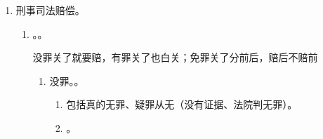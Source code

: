 \begin{enumerate}
\begin{kk}{为啥赔、谁来赔、赔给谁、怎么赔}
\begin{enumerate}
\begin{enumerate}
                    \item 复议加重侵害 \yjt 按份（各赔各）。原则共同被告，单独起诉一方，未被起诉的追加为第三人。
                    \item 派出所永远不赔。
                    \item 共同侵权共同赔。
                    \item 无意思联络的数人侵权。A || B/A + B \yjt 原因力竞合/结合 \yjt 连带/按份。
                    \item 第三人侵权。。
                  \end{enumerate}
            \item 赔给谁。\yi 同原告。\er 支付了合理费用的人可以要求赔偿。。
            \item 怎么赔。
                  \begin{enumerate}
                    \item 一并赔 = 。在复议/行政诉讼程序中直接提。。
                    \item 单独赔。
                          \begin{enumerate}
                            \item 时效 2 年。审期同诉讼的一审、二审审期。
                            \item 2 步走。自己（先行处理） \yjt 爹（行政赔偿诉讼）。和行政诉讼、复议地位相等。
                          \end{enumerate}
                  \end{enumerate}
          \end{enumerate}
        \end{kk}
  \item 刑事司法赔偿。
        \begin{enumerate}
          \item {}。。
                \begin{kk}{没罪关了就要赔，有罪关了也白关；免罪关了分前后，赔后不赔前}
                  \begin{enumerate}
                    \item 没罪。。
                          \begin{enumerate}
                            \item 包括真的无罪、疑罪从无（没有证据、法院判无罪）。
                            \item {}。

\end{enumerate}
\end{enumerate}
\end{kk}
\end{enumerate}
\end{enumerate}
